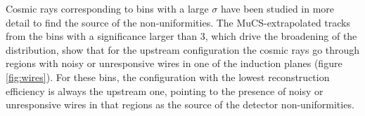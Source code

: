 \documentclass[a4paper,11pt]{article}
\begin{document}
%

 Cosmic rays corresponding to bins with a large $\sigma$ have been studied in more detail to find the source of the non-uniformities. The MuCS-extrapolated tracks from the bins with a significance larger than 3, which drive the broadening of the distribution, show that for the upstream configuration the cosmic rays go through regions with noisy or unresponsive wires in one of the induction planes (figure \ref{fig:wires}). For these bins, the configuration with the lowest reconstruction efficiency is always the upstream one, pointing to the presence of noisy or unresponsive wires in that regions as the source of the detector non-uniformities.
\end{document}
